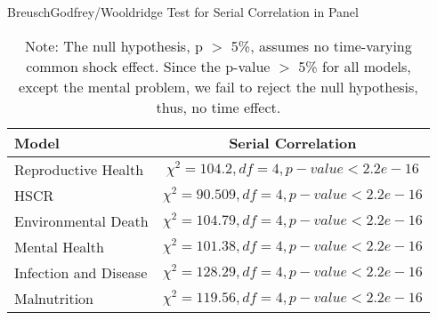 \begin{table}[H]
    \centering
    \caption{BreuschGodfrey/Wooldridge Test for Serial Correlation in Panel}
    \begin{tabular}{lc}
        \toprule
        \textbf{Model} & \textbf{Serial Correlation}  \\
        \midrule
        Reproductive Health & $\chi^2 = 104.2, df = 4, p-value < 2.2e-16$  \\
        HSCR  & $ \chi^2 = 90.509, df = 4, p-value < 2.2e-16$ \\
        Environmental Death & $\chi^2 = 104.79, df = 4, p-value < 2.2e-16 $ \\
        Mental Health & $\chi^2 = 101.38, df = 4, p-value < 2.2e-16 $\\
        Infection and Disease & $\chi^2 = 128.29, df = 4, p-value < 2.2e-16$  \\
        Malnutrition & $\chi^2 = 119.56, df = 4, p-value < 2.2e-16$  \\
        \bottomrule
    \end{tabular}
    \vspace{0.5em} %
    \caption*{Note: The null hypothesis, p $>$ 5\%, assumes no time-varying common shock effect. Since the p-value $>$ 5\% for all models, except the mental problem, we fail to reject the null hypothesis, thus, no time effect.}
    \label{Tab::Serial_corr_Test}
\end{table}

